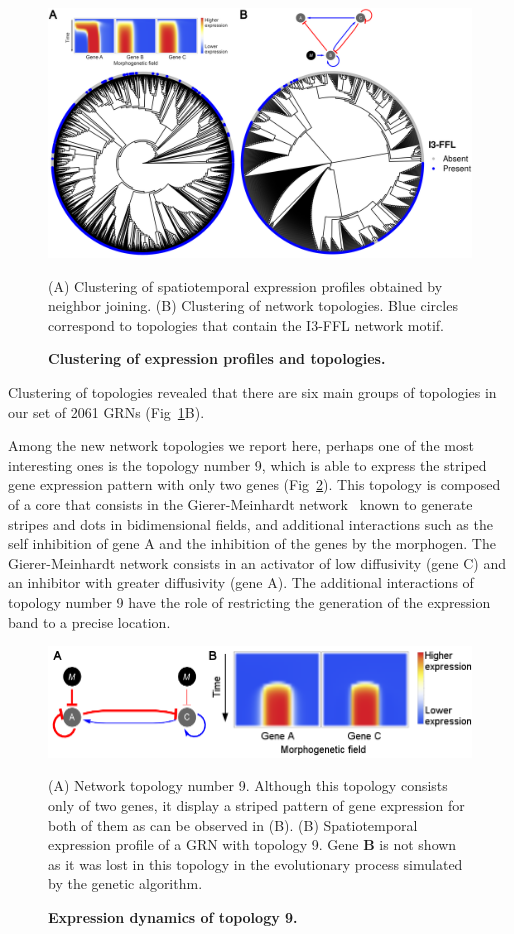 \documentclass[10pt,letterpaper]{article}
\begin{document}
\begin{figure}[!h]
 \includegraphics[width=\textwidth]{figures/results/Fig7}
 \caption{\bf Clustering of expression profiles and topologies.}
 (A) Clustering of spatiotemporal expression profiles obtained by
 neighbor joining. (B) Clustering of network topologies. Blue circles
 correspond to topologies that contain the I3-FFL network motif.
 \label{fig:clustering}
\end{figure}

Clustering of topologies revealed that there are six main groups of topologies
in our set of 2061 GRNs (Fig~\ref{fig:clustering}B).

Among the new network topologies we report here, perhaps one of the most
interesting ones is the topology number 9, which is able to express the striped
gene expression pattern with only two genes (Fig~\ref{fig:topol9}).
This topology is composed of a core that consists in the
Gierer-Meinhardt network~\cite{giererMeinh1972, meinhardt2000} known to
generate stripes and dots in bidimensional fields, and additional
interactions such as the self inhibition of gene A and the inhibition of the genes
by the morphogen. The Gierer-Meinhardt network consists in an activator of low
diffusivity (gene C) and an inhibitor with greater diffusivity (gene A). The additional
interactions of topology number 9 have the role of restricting the generation of
the expression band to a precise location.

\begin{figure}[!h]
 \includegraphics[width=\textwidth]{figures/results/Fig8}
 \caption{\bf Expression dynamics of topology 9.}
 (A) Network topology number 9. Although this topology consists only of two
 genes, it display a striped pattern of gene expression for both of them as
 can be observed in (B). (B) Spatiotemporal expression profile of a GRN
 with topology 9. Gene \textbf{B} is not shown as it was lost in this topology
 in the evolutionary process simulated by the genetic algorithm.
 \label{fig:topol9}
\end{figure}
\end{document}
